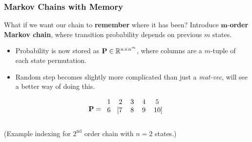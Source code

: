 \documentclass{beamer}
\begin{document}
\begin{frame}
\frametitle{Markov Chains with Memory}
What if we want our chain to \textbf{remember} where it has been?  Introduce $\boldsymbol{m}$-\textbf{order Markov chain}, where transition probability depends on previous $m$ states.  

\begin{itemize}
\item Probability is now stored as ${\bf P} \in \mathbb{R}^{n \times n^m}$, where columns are a $m$-tuple of each state permutation.
\item Random step becomes slightly more complicated than just a \textit{mat-vec}, will see a better way of doing this.
\end{itemize}


\[
{\bf P} = 
\begin{blockarray}{ccccc}
	1 & 2 & 3 & 4 & 5 \\
	\begin{block}{c[cccc]}
		6 & 7 & 8 & 9 & 10 \\
	\end{block}
\end{blockarray}
\]

\begin{tiny}
(Example indexing for $2^{\text{nd}}$ order chain with $n=2$ states.)
\end{tiny}


\end{frame}
\end{document}
